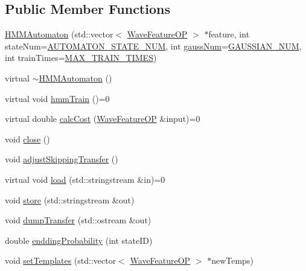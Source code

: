 \subsection*{Public Member Functions}
\begin{DoxyCompactItemize}
\item 
\hyperlink{class_h_m_m_automaton_a27cacf1d1e73c9b48cf614f1c8b8921c}{H\+M\+M\+Automaton} (std\+::vector$<$ \hyperlink{class_wave_feature_o_p}{Wave\+Feature\+O\+P} $>$ $\ast$feature, int state\+Num=\hyperlink{configure__hmm_8h_aa9cc71cb42394379957677c761aae79e}{A\+U\+T\+O\+M\+A\+T\+O\+N\+\_\+\+S\+T\+A\+T\+E\+\_\+\+N\+U\+M}, int \hyperlink{pro6__demo_8cpp_a923ffcfa3c56ccdba17bc4e700247d54}{gauss\+Num}=\hyperlink{configure__hmm_8h_a8f9db0624fff0b17f641785bb8d66a82}{G\+A\+U\+S\+S\+I\+A\+N\+\_\+\+N\+U\+M}, int train\+Times=\hyperlink{configure__hmm_8h_a52e22519b5a37e58632e9183d5197b86}{M\+A\+X\+\_\+\+T\+R\+A\+I\+N\+\_\+\+T\+I\+M\+E\+S})
\item 
virtual \hyperlink{class_h_m_m_automaton_aceb16780fdcef5093d0e9faca938757d}{$\sim$\+H\+M\+M\+Automaton} ()
\item 
virtual void \hyperlink{class_h_m_m_automaton_ac6bbc2770cb11b1c9e55cd0652fbe0e3}{hmm\+Train} ()=0
\item 
virtual double \hyperlink{class_h_m_m_automaton_a4c43e2b6bba8c6f237bf4503d79b1f12}{calc\+Cost} (\hyperlink{class_wave_feature_o_p}{Wave\+Feature\+O\+P} \&input)=0
\item 
void \hyperlink{class_h_m_m_automaton_ac4deb72548be0ec35f83adc374518986}{close} ()
\item 
void \hyperlink{class_h_m_m_automaton_a522f7a4ffa67d79d9303be3e602c7f88}{adjust\+Skipping\+Transfer} ()
\item 
virtual void \hyperlink{class_h_m_m_automaton_a04b64e19e77d5fe8b78d471470346872}{load} (std\+::stringstream \&in)=0
\item 
void \hyperlink{class_h_m_m_automaton_a55a1374058fe22b69eceea075cf4c68f}{store} (std\+::stringstream \&out)
\item 
void \hyperlink{class_h_m_m_automaton_a46af46bd5a90c22ecea1076805e595d0}{dump\+Transfer} (std\+::ostream \&out)
\item 
double \hyperlink{class_h_m_m_automaton_a8e3043723eb18068bb5cb9840f844647}{endding\+Probability} (int state\+I\+D)
\item 
void \hyperlink{class_h_m_m_automaton_a6aa2c2115023896733005f050097a457}{set\+Templates} (std\+::vector$<$ \hyperlink{class_wave_feature_o_p}{Wave\+Feature\+O\+P} $>$ $\ast$new\+Temps)
\end{DoxyCompactItemize}
